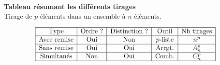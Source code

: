    \textbf{Tableau résumant les   différents tirages}\\
 Tirage de $p$ éléments dans un ensemble à $n$ éléments.
 
\[
\begin{array}{|c|c|c|c|c|}
\hline
\text{Type} & \text{Ordre ?} & \text{Distinction ?} & \text{Outil} & \text{Nb tirages} \\
\hline
\text{Avec remise}  &   \text{Oui}  & \text{Non} & p\text{-liste} &  n^{p}  \\
\hline
\text{Sans remise} & \text{Oui} & \text{Oui} & \text{Arrgt.} &  A_n^p \\
\hline
\text{Simultanés}  & \text{Non} & \text{Oui} & \text{Comb.} & C_n^p \\
\hline
\end{array}
\]


